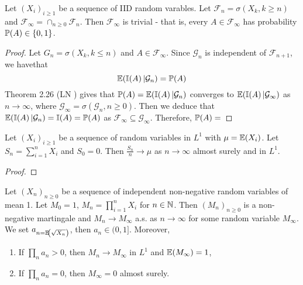 \begin{thm}
  \label{defn:discrete_time_martingales:17}
  Let $(X_{i})_{i \geq 1}$ be a sequence of IID random varables.  Let
  $\mathcal{F}_{n} = \sigma(X_{k}, k \geq n)$ and
  $\mathcal{F}_{\infty} = \cap_{n \geq 0} \mathcal{F}_{n}$.  Then
  $\mathcal{F}_{\infty}$ is trivial - that is, every $A \in
  \mathcal{F}_{\infty}$ has probability $\Prob{A} \in \{ 0, 1 \}$.
\end{thm}

\begin{proof}
  Let $G_{n} = \sigma(X_{k}, k \leq n)$ and $A \in
  \mathcal{F}_{\infty}$.  Since $\mathcal{G}_{n}$ is independent of
  $\mathcal{F}_{n+1}$, we havethat
  \begin{equation}
    \label{eq:47}
    \E{\I{A} | \mathcal{G}_{n}} = \Prob{A}
  \end{equation}
  Theorem 2.26 (LN ) gives that
  $\Prob{A} = \E{\I{A} | \mathcal{G}_{n}}$ converges to $\E{\I{A} |
    \mathcal{G}_{\infty}}$ as $n \rightarrow \infty$, where
  $\mathcal{G}_{\infty} = \sigma(\mathcal{G}_{n}, n \geq 0)$.  Then we
  deduce that $\E{\I{A} | \mathcal{G}_{n}} = \I{A} = \Prob{A}$ as
  $\mathcal{F}_{\infty} \subseteq \mathcal{G}_{\infty}$.  Therefore,
  $\Prob{A} = $
\end{proof}

\begin{thm}
  \label{defn:discrete_time_martingales:18}
  Let $(X_{i})_{i \geq 1}$ be a sequence of \iid random variables in
  $L^{1}$ with $\mu = \E{X_{i}}$.  Let $S_{n} = \sum_{i=1}^{n} X_{i}$
  and $S_{0} = 0$. Then $\frac{S_{n}}{n} \rightarrow \mu$ as $n
  \rightarrow \infty$ almost surely and in $L^{1}$.
\end{thm}

\begin{proof}
\end{proof}

\begin{thm}
  \label{defn:discrete_time_martingales:19}
  Let $(X_{n})_{n \geq 0}$ be a sequence of independent non-negative
  random variables of mean 1.  Let $M_{0} = 1$, $M_{n} =
  \prod_{i=1}^{n} X_{i}$ for $n \in \mathbb{N}$.  Then $(M_{n})_{n \geq 0}$ is
  a non-negative martingale and $M_{n} \rightarrow M_{\infty}$ a.s.
  as $n \rightarrow \infty$ for some random variable $M_{\infty}$.  We
  set $a_{n = \E{\sqrt{X_{n}}}}$, then $a_{n}\in (0, 1]$.  Moreover,
  \begin{enumerate}
  \item If $\prod_{n} a_{n} > 0$, then $M_{n} \rightarrow M_{\infty}$
    in $L^{1}$ and $\E{M_{\infty}} = 1$,
  \item If $\prod_{n} a_{n} = 0$, then $M_{\infty} = 0$ almost surely.
  \end{enumerate}
\end{thm}

